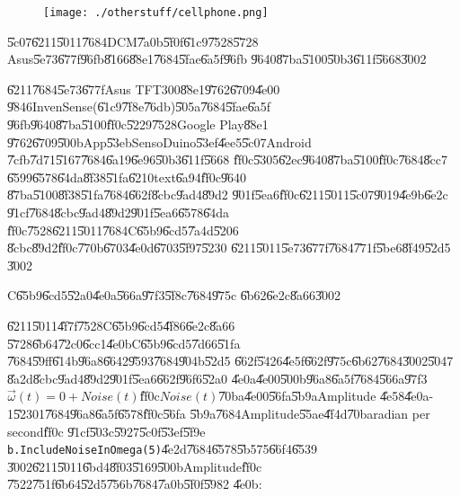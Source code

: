 \begin{figure}[th]
\caption{{}}
\begin{center}
\texttt{[image: ./otherstuff/cellphone.png]}
\end{center}
\end{figure}

\begin{case}
\U{5c07}\U{6211}\U{5011}\U{7684}DCM\U{7a0b}\U{5f0f}\U{61c9}\U{7528}\U{5728}%
Asus\U{5e73}\U{677f}\U{96fb}\U{8166}\U{88e1}\U{7684}\U{5fae}\U{6a5f}\U{96fb}%
\U{9640}\U{87ba}\U{5100}\U{50b3}\U{611f}\U{5668}\U{3002}
\end{case}

\U{6211}\U{7684}\U{5e73}\U{677f}Asus TFT300\U{88e1}\U{9762}\U{6709}\U{4e00}%
\U{9846}InvenSense(\U{61c9}\U{7f8e}\U{76db})\U{505a}\U{7684}\U{5fae}\U{6a5f}%
\U{96fb}\U{9640}\U{87ba}\U{5100}\U{ff0c}\U{5229}\U{7528}Google Play\U{88e1}%
\U{9762}\U{6709}\U{500b}App\U{53eb}SensoDuino\U{53ef}\U{4ee5}\U{5c07}Android%
\U{7cfb}\U{7d71}\U{5167}\U{7684}\U{6a19}\U{6e96}\U{50b3}\U{611f}\U{5668}%
\U{ff0c}\U{5305}\U{62ec}\U{9640}\U{87ba}\U{5100}\U{ff0c}\U{7684}\U{8cc7}%
\U{6599}\U{6578}\U{64da}\U{8f38}\U{51fa}\U{6210}text\U{6a94}\U{ff0c}\U{9640}%
\U{87ba}\U{5100}\U{8f38}\U{51fa}\U{7684}\U{662f}\U{8cbc}\U{9ad4}\U{89d2}%
\U{901f}\U{5ea6}\U{ff0c}\U{6211}\U{5011}\U{5c07}\U{9019}\U{4e9b}\U{6e2c}%
\U{91cf}\U{7684}\U{8cbc}\U{9ad4}\U{89d2}\U{901f}\U{5ea6}\U{6578}\U{64da}%
\U{ff0c}\U{7528}\U{6211}\U{5011}\U{7684}C\U{65b9}\U{6cd5}\U{7a4d}\U{5206}%
\U{8cbc}\U{89d2}\U{ff0c}\U{770b}\U{6703}\U{4e0d}\U{6703}\U{5f97}\U{5230}%
\U{6211}\U{5011}\U{5e73}\U{677f}\U{7684}\U{771f}\U{5be6}\U{8f49}\U{52d5}%
\U{3002}

\clearpage%

\begin{case}
C\U{65b9}\U{6cd5}\U{52a0}\U{4e0a}\U{566a}\U{97f3}\U{5f8c}\U{7684}\U{975c}%
\U{6b62}\U{6e2c}\U{8a66}\U{3002}
\end{case}

\U{6211}\U{5011}\U{4f7f}\U{7528}C\U{65b9}\U{6cd5}\U{4f86}\U{6e2c}\U{8a66}%
\U{5728}\U{6b64}\U{72c0}\U{6cc1}\U{4e0b}C\U{65b9}\U{6cd5}\U{7d66}\U{51fa}%
\U{7684}\U{59ff}\U{614b}\U{96a8}\U{6642}\U{9593}\U{7684}\U{904b}\U{52d5}%
\U{662f}\U{5426}\U{4e5f}\U{662f}\U{975c}\U{6b62}\U{7684}\U{3002}\U{5047}%
\U{8a2d}\U{8cbc}\U{9ad4}\U{89d2}\U{901f}\U{5ea6}\U{662f}\U{96f6}\U{52a0}%
\U{4e0a}\U{4e00}\U{500b}\U{96a8}\U{6a5f}\U{7684}\U{566a}\U{97f3}$\vec{\omega}%
(t)=0+Noise(t)$\U{ff0c}$Noise(t)$\U{70ba}\U{4e00}\U{56fa}\U{5b9a}Amplitude%
\U{4e58}\U{4e0a}-1\U{5230}1\U{7684}\U{96a8}\U{6a5f}\U{6578}\U{ff0c}\U{56fa}%
\U{5b9a}\U{7684}Amplitude\U{55ae}\U{4f4d}\U{70ba}radian per second\U{ff0c}%
\U{91cf}\U{503c}\U{5927}\U{5c0f}\U{53ef}\U{5f9e}\texttt{%
b.IncludeNoiseInOmega(5)}\U{4e2d}\U{7684}\U{6578}\U{5b57}5\U{66f4}\U{6539}%
\U{3002}\U{6211}\U{5011}\U{6bd4}\U{8f03}\U{5169}\U{500b}Amplitude\U{ff0c}%
\U{7522}\U{751f}\U{6b64}\U{52d5}\U{756b}\U{7684}\U{7a0b}\U{5f0f}\U{5982}%
\U{4e0b}:

